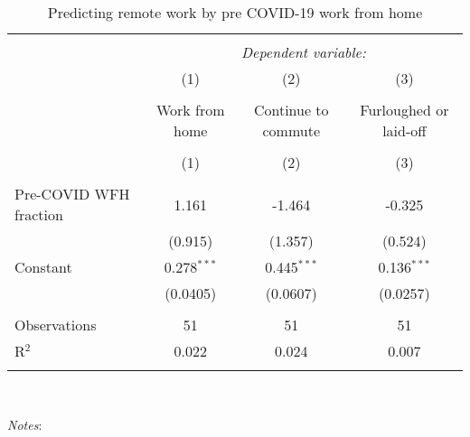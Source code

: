 
\begin{table}[!htbp] \centering 
  \caption{Predicting remote work by pre COVID-19 work from home} 
  \label{tab:priorremotework} 
\small 
\begin{tabular}{@{\extracolsep{5pt}}lccc} 
\\[-1.8ex]\hline 
\hline \\[-1.8ex] 
 & \multicolumn{3}{c}{\textit{Dependent variable:}} \\ 
 \cline{2-4} 
 & (1) & (2) & (3) \\
 \\[-1.8ex] & Work from home & Continue to commute & Furloughed or laid-off \\ 
 \\[-1.8ex] & (1) & (2) & (3) \\ 
\hline \\[-1.8ex] 
Pre-COVID WFH fraction & 1.161 & -1.464 & -0.325 \\
 & (0.915) & (1.357) & (0.524) \\
Constant & 0.278$^{***}$ & 0.445$^{***}$ & 0.136$^{***}$ \\
 & (0.0405) & (0.0607) & (0.0257) \\
 &  &  &  \\
Observations & 51 & 51 & 51 \\
 R$^{2}$ & 0.022 & 0.024 & 0.007 \\ \hline
\hline 
\hline \\[-1.8ex] 
\end{tabular}
\\
\begin{minipage}{1.0 \textwidth}
{\footnotesize \emph{Notes}: 
\starlanguage}
\end{minipage}
\end{table}
